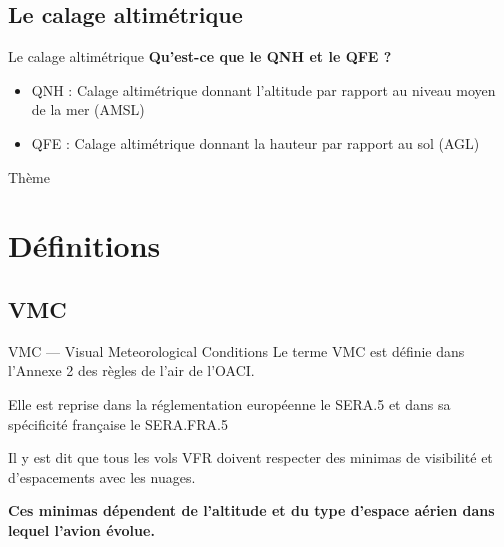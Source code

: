 \documentclass{beamer}
\begin{document}
\subsection{Le calage altimétrique}
\begin{frame}{Le calage altimétrique}
  \textbf{Qu'est-ce que le QNH et le QFE ?}
  
  \begin{itemize}
    \item QNH : Calage altimétrique donnant l'altitude par rapport au niveau moyen de la mer (AMSL) \pause
    \item QFE : Calage altimétrique donnant la hauteur par rapport au sol (AGL)
  \end{itemize}

\end{frame}

\begin{frame}{Thème}
  \tableofcontents[hideallsubsections]
\end{frame}

\section{Définitions}
\subsection{VMC}
\begin{frame}{VMC — Visual Meteorological Conditions}
  Le terme VMC est définie dans l'Annexe 2 des règles de l'air de l'OACI.
  \vspace*{1em} \pause

  Elle est reprise dans la réglementation européenne le SERA.5 et dans
  sa spécificité française le SERA.FRA.5
  \vspace*{1em} \pause

  Il y est dit que tous les vols VFR doivent respecter des minimas de
  visibilité et d'espacements avec les nuages.
  \vspace*{1em} \pause

  \textbf{Ces minimas dépendent de l'altitude et du type d'espace aérien dans
  lequel l'avion évolue.}

\end{frame}
\end{document}
